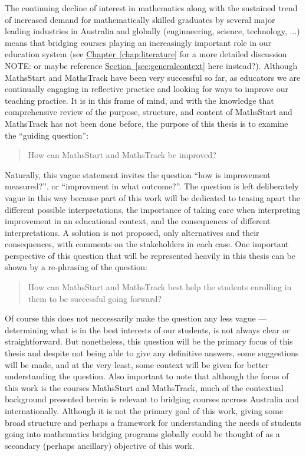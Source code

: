 \documentclass[twoside,12pt,a4paper]{report}
\newcommand{\refchap}[1]{\hyperref[chap:#1]{Chapter~\ref{chap:#1}}}
\newcommand{\refsec}[1]{\hyperref[sec:#1]{Section~\ref{sec:#1}}}
\begin{document}
The continuing decline of interest in mathematics along with the sustained trend of increased demand for mathematically skilled graduates by several major leading industries in Australia and globally (enginneering, science, technology, ...) means that bridging courses playing an increasingly important role in our education system (see \refchap{literature} for a more detailed discussion NOTE: or maybe reference \refsec{generalcontext} here instead?). Although MathsStart and MathsTrack have been very successful so far, as educators we are continually engaging in reflective practice and looking for ways to improve our teaching practice. It is in this frame of mind, and with the knowledge that comprehensive review of the purpose, structure, and content of MathsStart and MathsTrack has not been done before, the purpose of this thesis is to examine the ``guiding question'':

\begin{quote}
	How can MathsStart and MathsTrack be improved?
\end{quote}

Naturally, this vague statement invites the question ``how is improvement measured?'', or ``improvment in what outcome?''. The question is left deliberately vague in this way because part of this work will be dedicated to teasing apart the different possible interpretations, the importance of taking care when interpreting improvement in an educational context, and the consequences of different interpretations. A solution is not proposed, only alternatives and their consequences, with comments on the stakeholders in each case. One important perspective of this question that will be represented heavily in this thesis can be shown by a re-phrasing of the question: 

\begin{quote}
	How can MathsStart and MathsTrack best help the students enrolling in them to be successful going forward?
\end{quote}

Of course this does not neccessarily make the question any less vague --- determining what is in the best interests of our students, is not always clear or straightforward. But nonetheless, this question will be the primary focus of this thesis and despite not being able to give any definitive answers, some suggestions will be made, and at the very least, some context will be given for better understanding the question. Also important to note that although the focus of this work is the courses MathsStart and MathsTrack, much of the contextual background presented herein is relevant to bridging courses accross Australia and internationally. Although it is not the primary goal of this work, giving some broad structure and perhaps a framework for understanding the needs of students going into mathematics bridging programs globally could be thought of as a secondary (perhaps ancillary) objective of this work.
\end{document}
